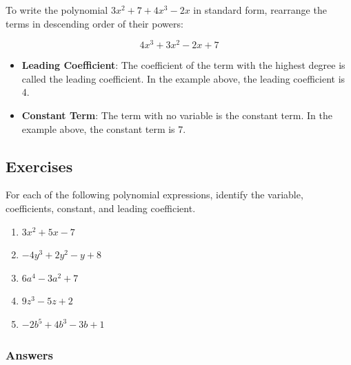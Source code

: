 \documentclass[12pt]{article}
\begin{document}
To write the polynomial \(3x^2 + 7 + 4x^3 - 2x\) in standard form, rearrange the terms in descending order of their powers:

\[
4x^3 + 3x^2 - 2x + 7
\]

\begin{itemize}
    \item \textbf{Leading Coefficient}: The coefficient of the term with the highest degree is called the leading coefficient. In the example above, the leading coefficient is 4.
    \item \textbf{Constant Term}: The term with no variable is the constant term. In the example above, the constant term is 7.
\end{itemize}

\subsection*{Exercises}

For each of the following polynomial expressions, identify the variable, coefficients, constant, and leading coefficient.

\begin{enumerate}
    \item $3x^2 + 5x - 7$
    \item $-4y^3 + 2y^2 - y + 8$
    \item $6a^4 - 3a^2 + 7$
    \item $9z^3 - 5z + 2$
    \item $-2b^5 + 4b^3 - 3b + 1$
\end{enumerate}

\subsubsection*{Answers}
\end{document}
